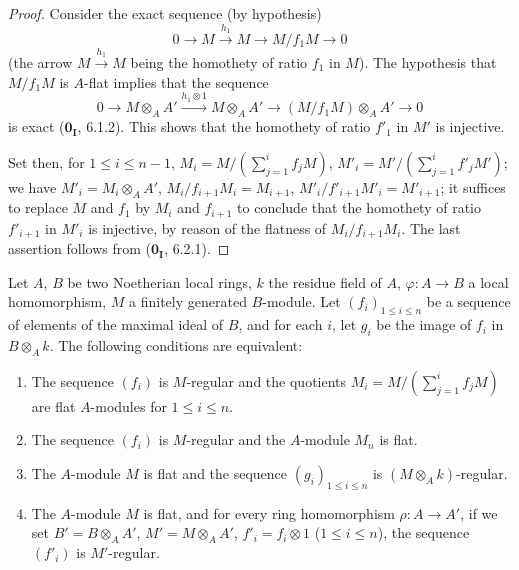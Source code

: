 \begin{proof}
Consider the exact sequence (by hypothesis)
\[
  0 \to M \xrightarrow{h_1} M \to M/f_1M \to 0
\]
(the arrow $M\xrightarrow{h_1}M$ being the homothety of ratio $f_1$ in $M$).
The hypothesis that $M/f_1M$ is $A$-flat implies that the sequence
\[
  0 \to M\otimes_AA' \xrightarrow{h_1\otimes 1} M\otimes_AA' \to (M/f_1M)\otimes_AA' \to 0
\]
is exact ($\mathbf{0_I}$, 6.1.2).
This shows that the homothety of ratio $f'_1$ in $M'$ is injective.

Set then, for $1\leq i\leq n-1$, $M_i=M/(\sum_{j=1}^i f_jM)$, $M'_i=M'/(\sum_{j=1}^i f'_jM')$;
we have $M'_i=M_i\otimes_AA'$, $M_i/f_{i+1}M_i=M_{i+1}$, $M'_i/f'_{i+1}M'_i=M'_{i+1}$;
it suffices to replace $M$ and $f_1$ by $M_i$ and $f_{i+1}$ to conclude that the homothety of ratio $f'_{i+1}$ in $M'_i$ is injective, by reason of the flatness of $M_i/f_{i+1}M_i$.
The last assertion follows from ($\mathbf{0_I}$, 6.2.1).
\end{proof}

\begin{proposition}[15.1.16]
\label{0.15.1.16}
Let $A$, $B$ be two Noetherian local rings, $k$ the residue field of $A$, $\varphi:A\to B$ a local homomorphism, $M$ a finitely generated $B$-module.
Let $(f_i)_{1\leq i\leq n}$ be a sequence of elements of the maximal ideal of $B$, and for each $i$, let $g_i$ be the image of $f_i$ in $B\otimes_Ak$.
The following conditions are equivalent:
\begin{enumerate}
  \item[a)] The sequence $(f_i)$ is $M$-regular and the quotients $M_i=M/(\sum_{j=1}^i f_jM)$ are flat $A$-modules for $1\leq i\leq n$.
  \item[b)] The sequence $(f_i)$ is $M$-regular and the $A$-module $M_n$ is flat.
  \item[c)] The $A$-module $M$ is flat and the sequence $(g_i)_{1\leq i\leq n}$ is $(M\otimes_Ak)$-regular.
  \item[d)] The $A$-module $M$ is flat, and for every ring homomorphism $\rho:A\to A'$, if we set $B'=B\otimes_AA'$, $M'=M\otimes_AA'$, $f'_i=f_i\otimes 1$ ($1\leq i\leq n$), the sequence $(f'_i)$ is $M'$-regular.
\end{enumerate}
\end{proposition}


